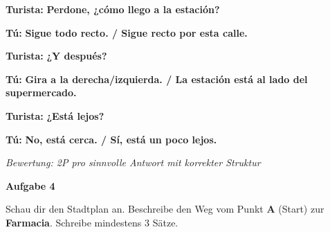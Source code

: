 \documentclass[11pt, a4paper]{article}
\newcommand{\fachfarbe}{spanisch}
\newcommand{\punktebox}[1]{\hfill\fbox{\small \_/#1}}
\newcommand{\loesung}[1]{\textcolor{loesung}{\textbf{#1}}}
\newenvironment{aufgabe}[1]{%
    \needspace{5\baselineskip}%
    \nopagebreak[4]%
    \vspace{10pt}
    \noindent\textbf{\textcolor{\fachfarbe}{Aufgabe #1}}
    \nopagebreak[4]%
    \vspace{5pt}
    \nopagebreak[4]%
    \begin{list}{}{\leftmargin=0pt}
    \item[]
}{%
    \end{list}
}
\newcommand{\es}[1]{\textcolor{\fachfarbe}{\textbf{#1}}}
\begin{document}
\noindent
\textbf{Turista:} \es{Perdone, ¿cómo llego a la estación?}

\vspace{0.3em}

\textbf{Tú:} \loesung{Sigue todo recto. / Sigue recto por esta calle.}

\vspace{0.8em}

\textbf{Turista:} \es{¿Y después?}

\vspace{0.3em}

\textbf{Tú:} \loesung{Gira a la derecha/izquierda. / La estación está al lado del supermercado.}

\vspace{0.8em}

\textbf{Turista:} \es{¿Está lejos?}

\vspace{0.3em}

\textbf{Tú:} \loesung{No, está cerca. / Sí, está un poco lejos.}

\vspace{0.8em}

\textit{\textcolor{grau}{Bewertung: 2P pro sinnvolle Antwort mit korrekter Struktur}}

\vspace{15pt}


\begin{aufgabe}{4}
Schau dir den Stadtplan an. Beschreibe den Weg vom Punkt \textbf{A} (Start) zur \textbf{Farmacia}. Schreibe mindestens 3 Sätze. \punktebox{6}
\end{aufgabe}
\end{document}
